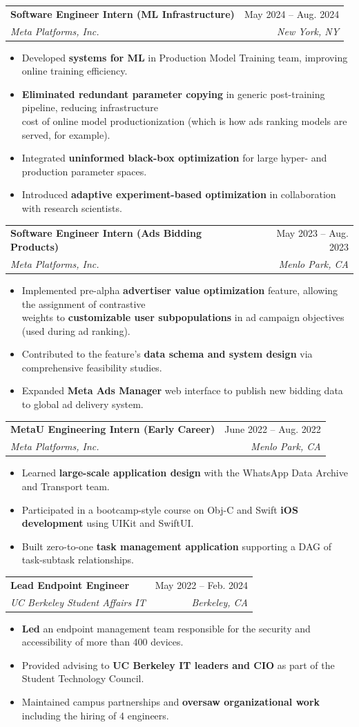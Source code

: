 \documentclass[letterpaper,11pt]{article}
\makeatletter
\newcommand{\resumeItem}[1]{
  \item\small{
    {#1 \vspace{-2pt}}
  }
}
\newcommand{\resumeSubheading}[4]{
  \vspace{-2pt}\item
    \begin{tabular*}{0.97\textwidth}[t]{l@{\extracolsep{\fill}}r}
      \textbf{#1} & \small#2 \\
      \textit{\small#3} & \textit{\small #4} \\
    \end{tabular*}\vspace{-7pt}
}
\newcommand{\resumeItemListStart}{\begin{itemize}}
\newcommand{\resumeItemListEnd}{\end{itemize}\vspace{-5pt}}
\makeatother
\begin{document}
    \resumeSubheading
      {Software Engineer Intern (ML Infrastructure)}{May 2024 -- Aug. 2024}
      {Meta Platforms, Inc.}{New York, NY}
      \resumeItemListStart
	  \resumeItem{Developed \textbf{systems for ML} in Production Model Training team, improving online training efficiency.}
	  \resumeItem{\textbf{Eliminated redundant parameter copying} in generic post-training pipeline, reducing infrastructure \\ cost of online model productionization (which is how ads ranking models are served, for example).}
		\resumeItem{Integrated \textbf{uninformed black-box optimization} for large hyper- and production parameter spaces.}
		\resumeItem{Introduced \textbf{adaptive experiment-based optimization} in collaboration with research scientists.}
      \resumeItemListEnd

    \resumeSubheading
      {Software Engineer Intern (Ads Bidding Products)}{May 2023 -- Aug. 2023}
      {Meta Platforms, Inc.}{Menlo Park, CA}
      \resumeItemListStart
	  \resumeItem{Implemented pre-alpha \textbf{advertiser value optimization} feature, allowing the assignment of contrastive \\ weights to \textbf{customizable user subpopulations} in ad campaign objectives (used during ad ranking).}
        \resumeItem{Contributed to the feature's \textbf{data schema and system design} via comprehensive feasibility studies.}
        \resumeItem{Expanded \textbf{Meta Ads Manager} web interface to publish new bidding data to global ad delivery system.}
      \resumeItemListEnd

    \resumeSubheading
      {MetaU Engineering Intern (Early Career)}{June 2022 -- Aug. 2022} 
      {Meta Platforms, Inc.}{Menlo Park, CA}
      \resumeItemListStart
        \resumeItem{Learned \textbf{large-scale application design} with the WhatsApp Data Archive and Transport team.}
        \resumeItem{Participated in a bootcamp-style course on Obj-C and Swift \textbf{iOS development} using UIKit and SwiftUI.}
        \resumeItem{Built zero-to-one \textbf{task management application} supporting a DAG of task-subtask relationships.}
    \resumeItemListEnd

    \resumeSubheading
    {Lead Endpoint Engineer}{May 2022 -- Feb. 2024}
    {UC Berkeley Student Affairs IT}{Berkeley, CA}
    \resumeItemListStart
        \resumeItem{\textbf{Led} an endpoint management team responsible for the security and accessibility of more than 400 devices.}
        \resumeItem{Provided advising to \textbf{UC Berkeley IT leaders and CIO} as part of the Student Technology Council.}
        \resumeItem{Maintained campus partnerships and \textbf{oversaw organizational work} including the hiring of 4 engineers.}
    \resumeItemListEnd
\end{document}
